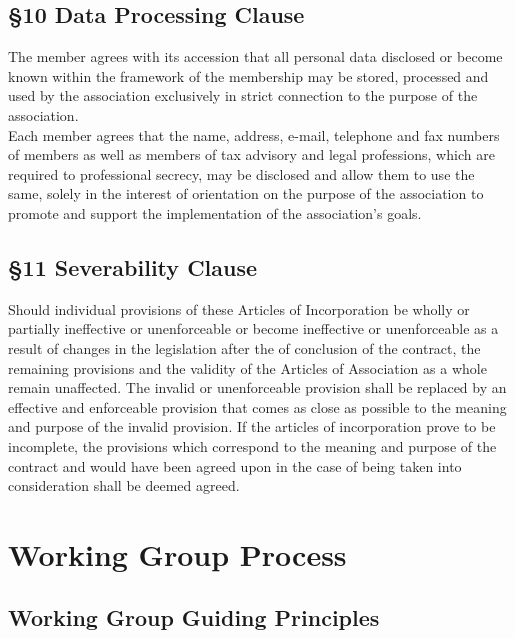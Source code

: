 \documentclass{article}
\begin{document}
\subsection{\S 10 Data Processing Clause}

The member agrees with its accession that all personal data disclosed or become known within the framework of the membership may be stored, processed and used by the association exclusively in strict connection to the purpose of the association. \\
Each member agrees that the name, address, e-mail, telephone and fax numbers of members as well as members of tax advisory and legal professions, which are required to professional secrecy, may be disclosed and allow them to use the same, solely in the interest of orientation on the purpose of the association to promote and support the implementation of the association's goals.

\subsection{\S 11 Severability Clause}

Should individual provisions of these Articles of Incorporation be wholly or partially ineffective or unenforceable or become ineffective or unenforceable as a result of changes in the legislation after the of conclusion of the contract, the remaining provisions and the validity of the Articles of Association as a whole remain unaffected. 
The invalid or unenforceable provision shall be replaced by an effective and enforceable provision that comes as close as possible to the meaning and purpose of the invalid provision.
 If the articles of incorporation prove to be incomplete, the provisions which correspond to the meaning and purpose of the contract and would have been agreed upon in the case of being taken into consideration shall be deemed agreed.

\newpage

\section{Working Group Process}

\subsection{Working Group Guiding Principles}
\end{document}
